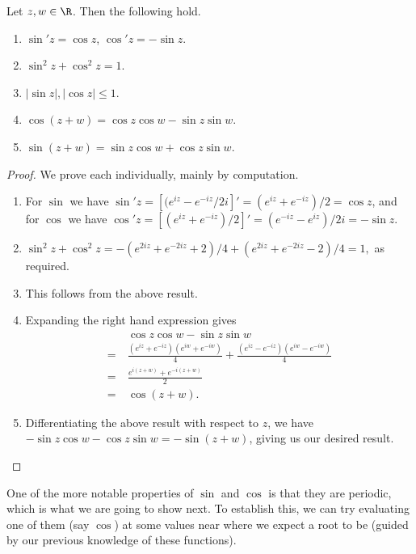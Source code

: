 \documentclass[a4paper]{scrartcl}
\begin{document}
\begin{proposition}
	Let $z, w \in \R$. Then the following hold.
	\begin{enumerate}[label=(\roman*)]
		\item $\sin' z = \cos z$, $\cos' z = -\sin z$.
		\item $\sin^2 z + \cos^2 z = 1$.
		\item $|\sin z|, |\cos z| \leq 1$.
		\item $\cos(z + w) = \cos z \cos w - \sin z \sin w$.
		\item $\sin(z + w) = \sin z \cos w + \cos z \sin w$.
	\end{enumerate}
\end{proposition}
\begin{proof}
	We prove each individually, mainly by computation.
	\begin{enumerate}[label=(\roman*)]
		\item For $\sin$ we have $\sin' z = \left[(e^{iz} - e^{-iz}/2i\right]' = (e^{iz} + e^{-iz})/2 = \cos z$, and for $\cos$ we have $\cos' z = \left[(e^{iz} + e^{-iz})/2\right]' = (e^{-iz} - e^{iz})/2i = -\sin z$.
		\item
		$
		\sin^2 z + \cos^2 z = -(e^{2iz} + e^{-2iz} + 2)/4 + (e^{2iz} + e^{-2iz} - 2)/4 = 1,
		$
		as required.
		\item This follows from the above result.
		\item Expanding the right hand expression gives 
		\begin{align*}
				&\cos z \cos w-\sin z \sin w \\
				=\ &\frac{\left(e^{i z}+e^{-i z}\right)\left(e^{i w}+e^{-i w}\right)}{4}+\frac{\left(e^{i z}-e^{-i z}\right)\left(e^{i w}-e^{-i w}\right)}{4} \\
				=\ &\frac{e^{i(z+w)}+e^{-i(z+w)}}{2} \\
				=\ &\cos (z+w).
		\end{align*}
		\item Differentiating the above result with respect to $z$, we have $-\sin z \cos w - \cos z \sin w = - \sin (z + w)$, giving us our desired result. \qedhere
	\end{enumerate}
\end{proof}

One of the more notable properties of $\sin$ and $\cos$ is that they are periodic, which is what we are going to show next. To establish this, we can try evaluating one of them (say $\cos$) at some values near where we expect a root to be (guided by our previous knowledge of these functions).
\end{document}
